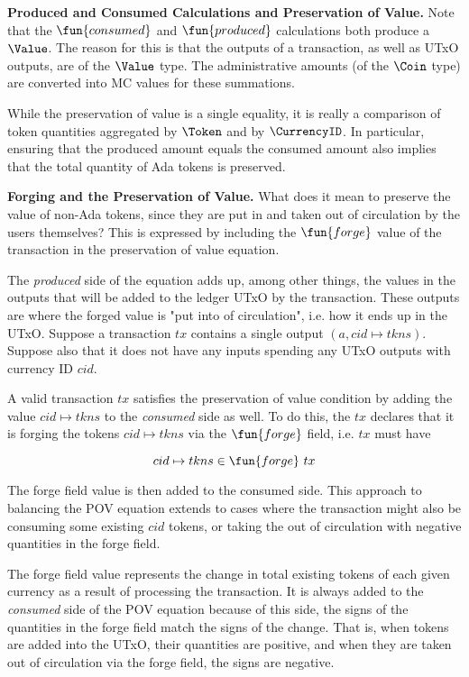 \textbf{Produced and Consumed Calculations and Preservation of Value.}
Note that
the $\fun{consumed}$ and $\fun{produced}$ calculations both produce a $\Value$.
The reason for this is that the outputs of a transaction, as well as UTxO outputs,
are of the $\Value$ type. The administrative amounts (of the $\Coin$ type)
are converted into MC values for these summations.

While the preservation of value is a single
equality, it is really a comparison of token quantities aggregated by
$\Token$ and by $\CurrencyID$. In particular, ensuring that the produced
amount equals the consumed amount also implies that the total quantity of
Ada tokens is preserved.

\textbf{Forging and the Preservation of Value.}
What does it mean to preserve the value of non-Ada tokens, since they
are put in and taken out of circulation by the users themselves?
This is expressed by including the $\fun{forge}$ value of the transaction
in the preservation of value equation.

The \textit{produced} side of the equation adds up, among other things, the
values in the
outputs that will be added to the ledger UTxO by the transaction. These outputs are
where the
forged value is "put into of circulation", i.e. how it ends up in the UTxO.
Suppose a transaction $tx$ contains a single output $(a, cid \mapsto tkns)$. Suppose
also that it does not
have any inputs spending any UTxO outputs with currency ID $cid$.

A valid transaction $tx$ satisfies the preservation of value
condition by adding the value $cid \mapsto tkns$ to the \textit{consumed} side as well.
To do this, the $tx$ declares that it is forging the tokens $cid \mapsto tkns$
via the $\fun{forge}$ field, i.e. $tx$ must have

\[cid \mapsto tkns\in\fun{forge}~tx\]

The forge field value is then added to the consumed side. This approach
to balancing the POV equation extends
to cases where the transaction might also be consuming some existing $cid$ tokens,
or taking the out of circulation with negative quantities in the forge field.

The forge field value represents the change in total existing tokens of each given currency
as a result of processing the transaction. It is always added to the
\textit{consumed} side of the POV equation because of this side, the signs of the
quantities in the forge field match the signs of the change. That is,
when tokens are added into the UTxO, their quantities are positive, and when they are
taken out of circulation via the forge field, the signs are negative.

